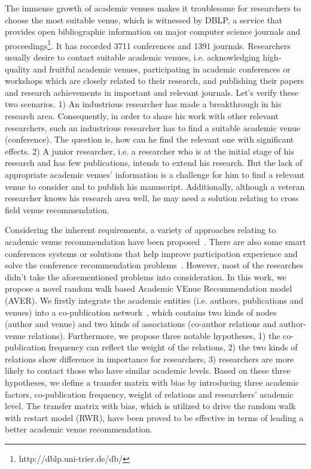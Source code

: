 \documentclass[9pt]{acm_proc_article-sp}
\begin{document}
The immense growth of academic venues makes it troublesome for researchers to choose the most suitable venue, which is witnessed by DBLP, a service that provides open bibliographic information on major computer science journals and proceedings\footnote{http://dblp.uni-trier.de/db/}. It has recorded 3711 conferences and 1391 journals. Researchers usually desire to contact suitable academic venues, i.e. acknowledging high-quality and fruitful academic venues, participating in academic conferences or workshops which are closely related to their research, and publishing their papers and research achievements in important and relevant journals. Let's verify these two scenarios. 1) An industrious researcher has made a breakthrough in his research area. Consequently, in order to share his work with other relevant researchers, such an industrious researcher has to find a suitable academic venue (conference). The question is, how can he find the relevant one with significant effects. 2) A junior researcher, i.e. a researcher who is at the initial stage of his research and has few publications, intends to extend his research. But the lack of appropriate academic venues' information is a challenge for him to find a relevant venue to consider and to publish his manuscript. Additionally, although a veteran researcher knows his research area well, he may need a solution relating to cross field venue recommendation.

Considering the inherent requirements, a variety of approaches relating to academic venue recommendation have been proposed~\cite{pham2011clustering,yang2012venue,luong2012publication,chen2012social,asabere2014improving}. There are also some smart conferences systems or solutions that help improve participation experience and solve the conference recommendation problems~\cite{wongchokprasitti2010conference}. However, most of the researches didn't take the aforementioned problems into consideration. In this work, we propose a novel random walk based Academic VEnue Recommendation model (AVER). We firstly integrate the academic entities (i.e. authors, publications and venues) into a co-publication network~\cite{lemarchand2012long}, which contains two kinds of nodes (author and venue) and two kinds of associations (co-author relations and author-venue relations). Furthermore, we propose three notable hypotheses, 1) the co-publication frequency can reflect the weight of the relations, 2) the two kinds of relations show difference in importance for researchers, 3) researchers are more likely to contact those who have similar academic levels. Based on these three hypotheses, we define a transfer matrix with bias by introducing three academic factors, co-publication frequency, weight of relations and researchers' academic level. The transfer matrix with bias, which is utilized to drive the random walk with restart model (RWR), have been proved to be effective in terms of leading a better academic venue recommendation.
\end{document}
